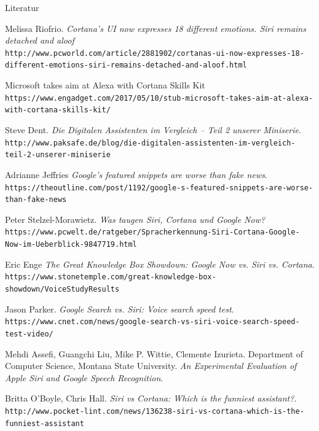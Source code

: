 \documentclass[18pt]{beamer}
\begin{document}
\begin{frame}[allowframebreaks]{Literatur}
\begin{thebibliography}{9}
	Melissa Riofrio.
	\textit{Cortana's UI now expresses 18 different emotions. Siri remains detached and aloof}
	\\\texttt{http://www.pcworld.com/article/2881902/cortanas-ui-now-expresses-18-different-emotions-siri-remains-detached-and-aloof.html}
	
	Microsoft takes aim at Alexa with Cortana Skills Kit
	\\\texttt{https://www.engadget.com/2017/05/10/stub-microsoft-takes-aim-at-alexa-with-cortana-skills-kit/}
	
	Steve Dent.
	\textit{Die Digitalen Assistenten im Vergleich – Teil 2 unserer Miniserie}.
	\\\texttt{http://www.paksafe.de/blog/die-digitalen-assistenten-im-vergleich-teil-2-unserer-miniserie}
	
	Adrianne Jeffries
	\textit{Google’s featured snippets are worse than fake news}.
	\\\texttt{https://theoutline.com/post/1192/google-s-featured-snippets-are-worse-than-fake-news}
	
	Peter Stelzel-Morawietz.
	\textit{Was taugen Siri, Cortana und Google Now?}
	\\\texttt{https://www.pcwelt.de/ratgeber/Spracherkennung-Siri-Cortana-Google-Now-im-Ueberblick-9847719.html}
	
	Eric Enge
	\textit{The Great Knowledge Box Showdown: Google Now vs. Siri vs. Cortana}.
	\\\texttt{https://www.stonetemple.com/great-knowledge-box-showdown/VoiceStudyResults}
	
	Jason Parker.
	\textit{Google Search vs. Siri: Voice search speed test}.
	\\\texttt{https://www.cnet.com/news/google-search-vs-siri-voice-search-speed-test-video/}
	
	Mehdi Assefi, Guangchi Liu, Mike P. Wittie, Clemente Izurieta. 
	Department of Computer Science, Montana State University.
	\textit{An Experimental Evaluation of Apple Siri and Google Speech Recognition}.
	
	Britta O'Boyle, Chris Hall.
	\textit{Siri vs Cortana: Which is the funniest assistant?}.
	\\\texttt{http://www.pocket-lint.com/news/136238-siri-vs-cortana-which-is-the-funniest-assistant} 
	
\end{thebibliography}
\end{frame}
\end{document}
